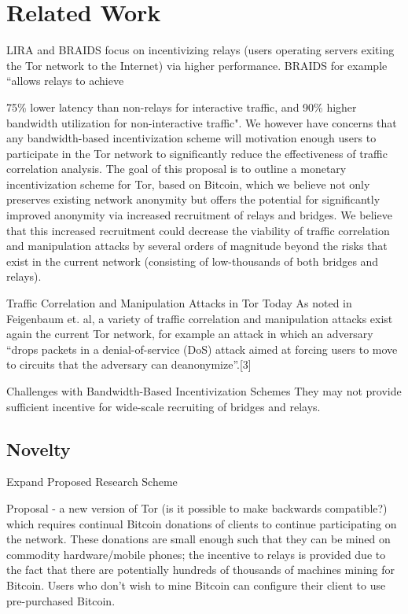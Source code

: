 \documentclass[letterpaper]{article}
\begin{document}
\section{Related Work}\label{sec:related}
LIRA and BRAIDS focus on incentivizing relays (users operating servers
exiting the Tor network to the Internet) via higher
performance. BRAIDS for example “allows relays to achieve

75\% lower latency than non-relays for interactive traffic, and 90\%
higher bandwidth utilization for non-interactive
traffic\cite{Jansen:2010:RNT:1866307.1866344}". We however have
concerns that any bandwidth-based incentivization scheme will
motivation enough users to participate in the Tor network to
significantly reduce the effectiveness of traffic correlation
analysis. The goal of this proposal is to outline a monetary
incentivization scheme for Tor, based on Bitcoin, which we believe not
only preserves existing network anonymity but offers the potential for
significantly improved anonymity via increased recruitment of relays
and bridges. We believe that this increased recruitment could decrease
the viability of traffic correlation and manipulation attacks by
several orders of magnitude beyond the risks that exist in the current
network (consisting of low-thousands of both bridges and relays).


Traffic Correlation and Manipulation Attacks in Tor Today
As noted in Feigenbaum et. al, a variety of traffic correlation and
manipulation attacks exist again the current Tor network, for example
an attack in which an adversary “drops packets in a denial-of-service
(DoS) attack aimed at forcing users to move to circuits that the
adversary can deanonymize”.[3]

Challenges with Bandwidth-Based Incentivization Schemes
They may not provide sufficient incentive for wide-scale recruiting of
bridges and relays.
\subsection{Novelty}\label{sec:novelty}

Expand Proposed Research Scheme

Proposal - a new version of Tor (is it possible to make backwards
compatible?) which requires continual Bitcoin donations of clients to
continue participating on the network. These donations are small
enough such that they can be mined on commodity hardware/mobile
phones; the incentive to relays is provided due to the fact that there
are potentially hundreds of thousands of machines mining for
Bitcoin. Users who don’t wish to mine Bitcoin can configure their
client to use pre-purchased Bitcoin.
\end{document}
